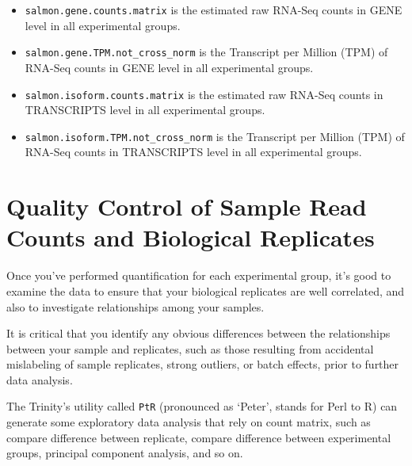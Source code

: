 \documentclass[
  letterpaper,
  DIV=11,
  numbers=noendperiod]{scrreprt}
\providecommand{\tightlist}{%
  \setlength{\itemsep}{0pt}\setlength{\parskip}{0pt}}\usepackage{longtable,booktabs,array}
\begin{document}
\begin{tcolorbox}
\begin{enumerate}
  \begin{itemize}
  \tightlist
  \item
    \texttt{salmon.gene.counts.matrix} is the estimated raw RNA-Seq
    counts in GENE level in all experimental groups.
  \item
    \texttt{salmon.gene.TPM.not\_cross\_norm} is the Transcript per
    Million (TPM) of RNA-Seq counts in GENE level in all experimental
    groups.
  \item
    \texttt{salmon.isoform.counts.matrix} is the estimated raw RNA-Seq
    counts in TRANSCRIPTS level in all experimental groups.
  \item
    \texttt{salmon.isoform.TPM.not\_cross\_norm} is the Transcript per
    Million (TPM) of RNA-Seq counts in TRANSCRIPTS level in all
    experimental groups.
  \end{itemize}
\end{enumerate}

\end{tcolorbox}

\hypertarget{quality-control-of-sample-read-counts-and-biological-replicates}{%
\section{Quality Control of Sample Read Counts and Biological
Replicates}\label{quality-control-of-sample-read-counts-and-biological-replicates}}

Once you've performed quantification for each experimental group, it's
good to examine the data to ensure that your biological replicates are
well correlated, and also to investigate relationships among your
samples.

It is critical that you identify any obvious differences between the
relationships between your sample and replicates, such as those
resulting from accidental mislabeling of sample replicates, strong
outliers, or batch effects, prior to further data analysis.

The Trinity's utility called \texttt{PtR} (pronounced as `Peter', stands
for Perl to R) can generate some exploratory data analysis that rely on
count matrix, such as compare difference between replicate, compare
difference between experimental groups, principal component analysis,
and so on.
\end{document}
